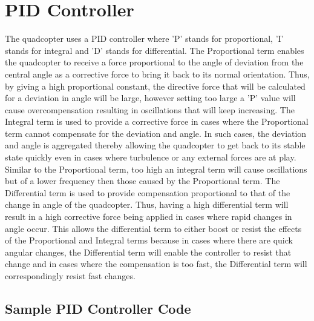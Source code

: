 \chapter{PID Controller}
The quadcopter uses a PID controller where 'P' stands for proportional, 'I' stands for integral and 'D' stands for differential. 
\newline
\newline
The Proportional term enables the quadcopter to receive a force proportional to the angle of deviation from the central angle as a corrective force to bring it back to its normal orientation. Thus, by giving a high proportional constant, the directive force that will be calculated for a deviation in angle will be large, however setting too large a 'P' value will cause overcompensation resulting in oscillations that will keep increasing.
\newline
\newline
The Integral term is used to provide a corrective force in cases where the Proportional term cannot compensate for the deviation and angle. In such cases, the deviation and angle is aggregated thereby allowing the quadcopter to get back to its stable state quickly even in cases where turbulence or any external forces are at play. Similar to the Proportional term, too high an integral term  will cause oscillations but of a lower frequency then those caused by the Proportional term.
\newline
\newline
The Differential term  is used to provide compensation proportional to that of the change in angle of the quadcopter. Thus, having a high differential term will result in a high corrective force being applied in cases where rapid changes in angle occur. This allows the differential term  to either boost or resist the effects of the Proportional and Integral terms because in cases where there are quick angular changes, the Differential term will enable the controller to resist that change and in cases where the compensation is too fast, the Differential term will correspondingly resist fast changes.
\section{Sample PID Controller Code}
   
